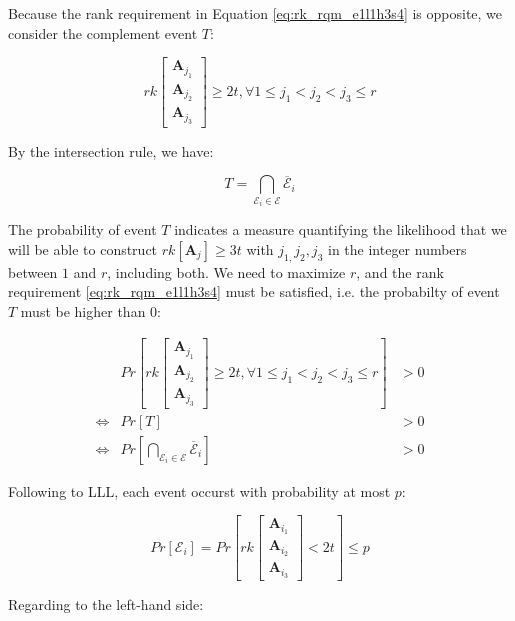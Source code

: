 Because the rank requirement in Equation \ref{eq:rk_rqm_e1l1h3s4}
is opposite, we consider the complement event $T$:

\[
rk\left[\begin{array}{c}
\boldsymbol{A}_{j_{1}}\\
\boldsymbol{A}_{j_{2}}\\
\boldsymbol{A}_{j_{3}}
\end{array}\right]\geq2t,\forall1\leq j_{1}<j_{2}<j_{3}\leq r
\]

By the intersection rule, we have:

\[
T=\underset{\mathcal{E}_{i}\in\mathcal{E}}{\bigcap}\overline{\mathcal{E}}_{i}
\]

The probability of event $T$ indicates a measure quantifying the
likelihood that we will be able to construct $rk\left[\boldsymbol{A}_{j}\right]\geq3t$
with $j_{1,}j_{2},j_{3}$ in the integer numbers between $1$ and
$r$, including both. We need to maximize $r$, and the rank requirement
\ref{eq:rk_rqm_e1l1h3s4} must be satisfied, i.e. the probabilty of
event $T$ must be higher than $0$:

\begin{eqnarray*}
 & Pr\left[rk\left[\begin{array}{c}
\boldsymbol{A}_{j_{1}}\\
\boldsymbol{A}_{j_{2}}\\
\boldsymbol{A}_{j_{3}}
\end{array}\right]\geq2t,\forall1\leq j_{1}<j_{2}<j_{3}\leq r\right] & >0\\
\Leftrightarrow & Pr\left[T\right] & >0\\
\Leftrightarrow & Pr\left[\underset{\mathcal{E}_{i}\in\mathcal{E}}{\bigcap}\overline{\mathcal{E}}_{i}\right] & >0
\end{eqnarray*}

Following to LLL, each event occurst with probability at most $p$:

\begin{equation}
Pr\left[\mathcal{E}_{i}\right]=Pr\left[rk\left[\begin{array}{c}
\boldsymbol{A}_{i_{1}}\\
\boldsymbol{A}_{i_{2}}\\
\boldsymbol{A}_{i_{3}}
\end{array}\right]<2t\right]\leq p\label{eq:p_in_LLL}
\end{equation}

Regarding to the left-hand side:

